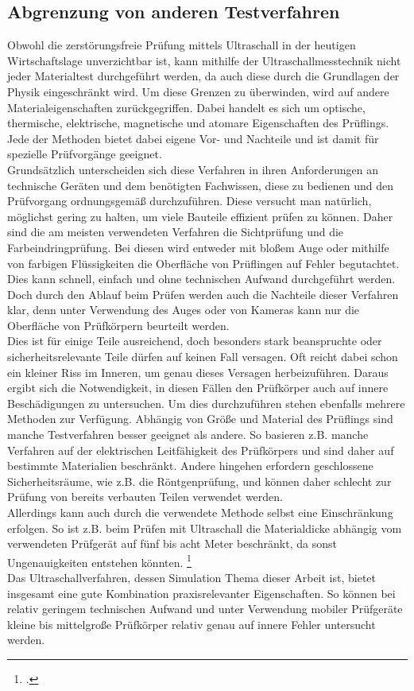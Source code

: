 \documentclass[reducespace,stylepage,semiarbeit]{spezidoc}
\begin{document}
\subsection{Abgrenzung von anderen Testverfahren}

Obwohl die zerstörungsfreie Prüfung mittels Ultraschall in der heutigen Wirtschaftslage unverzichtbar ist, kann mithilfe der Ultraschallmesstechnik nicht jeder Materialtest durchgeführt werden, da auch diese durch die Grundlagen der Physik eingeschränkt wird.
Um diese Grenzen zu überwinden, wird auf andere Materialeigenschaften zurückgegriffen.
Dabei handelt es sich um optische, thermische, elektrische, magnetische und atomare Eigenschaften des Prüflings. 
Jede der Methoden bietet dabei eigene Vor- und Nachteile und ist damit für spezielle Prüfvorgänge geeignet. \\ 
Grundsätzlich unterscheiden sich diese Verfahren in ihren Anforderungen an technische Geräten und dem benötigten Fachwissen, diese zu bedienen und den Prüfvorgang ordnungsgemäß durchzuführen. 
Diese versucht man natürlich, möglichst gering zu halten, um viele Bauteile effizient prüfen zu können.
Daher sind die am meisten verwendeten Verfahren die Sichtprüfung und die Farbeindringprüfung. 
Bei diesen wird entweder mit bloßem Auge oder mithilfe von farbigen Flüssigkeiten die Oberfläche von Prüflingen auf Fehler begutachtet. 
Dies kann schnell, einfach und ohne technischen Aufwand durchgeführt werden.
Doch durch den Ablauf beim Prüfen werden auch die Nachteile dieser Verfahren klar, denn unter Verwendung des Auges oder von Kameras kann nur die Oberfläche von Prüfkörpern beurteilt werden. \\
Dies ist für einige Teile ausreichend, doch besonders stark beanspruchte oder sicherheitsrelevante Teile dürfen auf keinen Fall versagen. 
Oft reicht dabei schon ein kleiner Riss im Inneren, um genau dieses Versagen herbeizuführen. 
Daraus ergibt sich die Notwendigkeit, in diesen Fällen den Prüfkörper auch auf innere Beschädigungen zu untersuchen.
Um dies durchzuführen stehen ebenfalls mehrere Methoden zur Verfügung.
Abhängig von Größe und Material des Prüflings sind manche Testverfahren besser geeignet als andere. 
So basieren z.B. manche Verfahren auf der elektrischen Leitfähigkeit des Prüfkörpers und sind daher auf bestimmte Materialien beschränkt.
Andere hingehen erfordern geschlossene Sicherheitsräume, wie z.B. die Röntgenprüfung, und können daher schlecht zur Prüfung von bereits verbauten Teilen verwendet werden.\\
Allerdings kann auch durch die verwendete Methode selbst eine Einschränkung erfolgen. So ist z.B. beim Prüfen mit Ultraschall die Materialdicke abhängig vom verwendeten Prüfgerät auf fünf bis acht Meter beschränkt, da sonst Ungenauigkeiten entstehen könnten. \footcite{ultraschall} \\
Das Ultraschallverfahren, dessen Simulation Thema dieser Arbeit ist, bietet insgesamt eine gute Kombination praxisrelevanter
 Eigenschaften. So können bei relativ geringem technischen Aufwand und unter Verwendung mobiler Prüfgeräte kleine bis mittelgroße Prüfkörper relativ genau auf innere Fehler untersucht werden.
\end{document}

